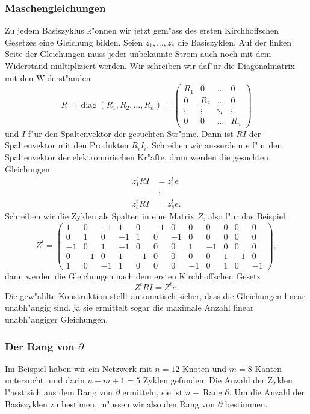 \subsubsection{Maschengleichungen}
Zu jedem Basiszyklus k"onnen wir jetzt gem"ass des ersten
Kirchhoffschen Gesetzes eine Gleichung bilden.
Seien $z_1,\dots,z_s$ die Basiszyklen.
Auf der linken Seite der Gleichungen muss jeder unbekannte Strom
auch noch mit dem Widerstand multipliziert werden.
Wir schreiben wir daf"ur die Diagonalmatrix
mit den Widerst"anden
\[
R=
\operatorname{diag}(R_1,R_2,\dots,R_n)=
\begin{pmatrix}
R_1&0&\dots&0\\
0&R_2&\dots&0\\
\vdots&\vdots&\ddots&\vdots\\
0&0&\dots&R_n
\end{pmatrix}
\]
und
$I$ f"ur den Spaltenvektor der gesuchten Str"ome. Dann ist $RI$
der Spaltenvektor mit den Produkten $R_iI_i$.
Schreiben wir ausserdem $e$ f"ur den
Spaltenvektor der elektromorischen Kr"afte, dann 
werden die gesuchten Gleichungen
\begin{align*}
z_1^tRI&=z_1^te\\
&\;\vdots\\
z_s^tRI&=z_s^te.
\end{align*}
Schreiben wir die Zyklen als Spalten in eine Matrix $Z$, also f"ur das
Beispiel
\[
Z^t=
\begin{pmatrix}
1&0&-1&1&0&-1&0&0&0&0&0&0\\
0&1&0&-1&1&0&-1&0&0&0&0&0\\
-1&0&1&-1&0&0&0&1&-1&0&0&0\\
0&-1&0&1&-1&0&0&0&0&1&-1&0\\
1&0&-1&1&0&0&0&-1&0&1&0&-1
\end{pmatrix},
\]
dann werden die Gleichungen nach dem ersten Kirchhoffschen Gesetz
\[
Z^tRI=Z^te.
\]
Die gew"ahlte Konstruktion stellt automatisch sicher, dass die
Gleichungen linear unabh"angig sind, ja sie ermittelt sogar
die maximale Anzahl linear unabh"angiger Gleichungen.

\subsubsection{Der Rang von $\partial$}
Im Beispiel haben wir ein Netzwerk mit $n=12$ Knoten und $m=8$
Kanten untersucht, und darin $n-m+1=5$ Zyklen gefunden. Die Anzahl
der Zyklen l"asst sich aus dem Rang von $\partial$ ermitteln,
sie ist $n-\operatorname{Rang}\partial$. Um die Anzahl der
Basiszyklen zu bestimen, m"ussen wir also den Rang von $\partial$
bestimmen.

